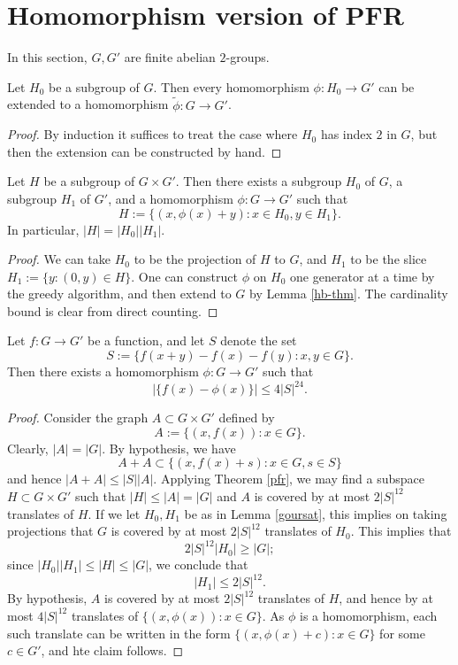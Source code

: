 \chapter{Homomorphism version of PFR}

In this section, $G, G'$ are finite abelian $2$-groups.

\begin{lemma}\label{hb-thm}  Let $H_0$ be a subgroup of $G$.  Then every homomorphism $\phi: H_0 \to G'$ can be extended to a homomorphism $\tilde \phi: G \to G'$.
\end{lemma}

\begin{proof}  By induction it suffices to treat the case where $H_0$ has index $2$ in $G$, but then the extension can be constructed by hand.
\end{proof}

\begin{lemma}\label{goursat}  Let $H$ be a subgroup of $G \times G'$.  Then there exists a subgroup $H_0$ of $G$, a subgroup $H_1$ of $G'$, and a homomorphism $\phi: G \to G'$ such that
$$ H := \{ (x, \phi(x) + y): x \in H_0, y \in H_1 \}.$$
In particular, $|H| = |H_0| |H_1|$.
\end{lemma}

\begin{proof} We can take $H_0$ to be the projection of $H$ to $G$, and $H_1$ to be the slice $H_1 := \{ y: (0,y) \in H \}$.  One can construct $\phi$ on $H_0$ one generator at a time by the greedy algorithm, and then extend to $G$ by Lemma \ref{hb-thm}.  The cardinality bound is clear from direct counting.
\end{proof}

\begin{theorem}\label{hom-pfr}  Let $f: G \to G'$ be a function, and let $S$ denote the set
$$ S := \{ f(x+y)-f(x)-f(y): x,y \in G \}.$$
Then there exists a homomorphism $\phi: G \to G'$ such that
$$ |\{ f(x) - \phi(x)\}| \leq 4 |S|^{24}.$$
\end{theorem}

\begin{proof} Consider the graph $A \subset G \times G'$ defined by
$$ A := \{ (x,f(x)): x \in G \}.$$
Clearly, $|A| = |G|$.  By hypothesis, we have
$$ A+A \subset \{ (x,f(x)+s): x \in G, s \in S\}$$
and hence $|A+A| \leq |S| |A|$.  Applying Theorem \ref{pfr}, we may find a subspace $H \subset G \times G'$ such that $|H| \leq |A|=|G|$ and $A$ is covered by at most $2|S|^{12}$ translates of $H$.  If we let $H_0,H_1$ be as in Lemma \ref{goursat}, this implies on taking projections that $G$ is covered by at most $2|S|^{12}$ translates of $H_0$.  This implies that
$$ 2|S|^{12} |H_0| \geq |G|;$$
since $|H_0| |H_1| \leq |H| \leq |G|$, we conclude that
$$ |H_1| \leq 2|S|^{12}.$$
By hypothesis, $A$ is covered by at most $2|S|^{12}$ translates of $H$, and hence by at most $4|S|^{12}$ translates of $\{ (x,\phi(x)): x \in G \}$.  As $\phi$ is a homomorphism, each such translate can be written in the form $\{ (x,\phi(x)+c): x \in G \}$ for some $c \in G'$, and hte claim follows.
\end{proof}